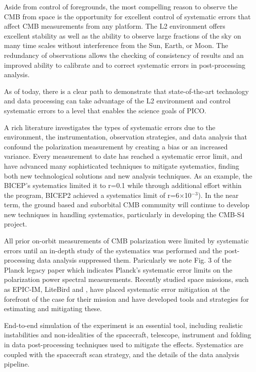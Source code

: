 \documentclass[PICOReport.tex]{subfiles}
\begin{document}
Aside from control of foregrounds, the most compelling reason to observe the CMB from space is the opportunity for excellent control of systematic errors that affect CMB measurements from any platform.  
The L2 environment offers excellent stability as well as the ability to observe large fractions of the sky on many time scales without interference from the Sun, Earth, or Moon.
The redundancy of observations allows the checking of consistency of results and an improved ability to calibrate and to correct systematic errors in post-processing analysis.

As of today, there is a clear path to demonstrate that state-of-the-art technology and data processing can take advantage of the L2 environment and control systematic errors to a level that enables the science goals of PICO. 

A rich literature investigates the types of systematic errors due to the environment, the instrumentation, observation strategies, and data analysis that confound the polarization measurement by creating a bias or an increased variance\cite{hu03,shimon2008,yadav2010}. 
Every measurement to date has  reached a systematic error limit, and have advanced many sophisticated techniques to mitigate systematics, finding both new technological solutions and new analysis techniques.
As an example, the BICEP's systematics limited it to r=0.1\cite{Takahaski2010} while through additional effort within the program, BICEP2 achieved a systematics limit of r=6$\times$10$^{-3}$\cite{BICEP2_III}).
In the near term, the ground based and suborbital CMB community will continue to develop new techniques in handling systematics, particularly in developing the CMB-S4 project.

All prior on-orbit measurements of CMB polarization were limited by systematic errors until an in-depth study of the systematics was performed and the post-processing data analysis suppressed them\cite{Bennett13,planck2016_xlvi,Planck2018_I}. 
Paricularly we note Fig. 3 of the Planck legacy paper which indicates Planck's systematic error limits on the polarization power spectral measurements.
Recently studied space missions, such as EPIC-IM, LiteBird and  \core, have placed
systematic error mitigation at the forefront of the case for their
mission and have developed tools and strategies for estimating and mitigating these\cite{hazumi2012,wallis2017,Natoli2018}.

End-to-end simulation of the experiment is an essential tool,
including realistic instabilities and non-idealities of the spacecraft,
telescope, instrument and folding in data post-processing techniques
used to mitigate the effects.  Systematics are coupled with the
spacecraft scan strategy, and the details of the 
data analysis pipeline.  
\end{document}
